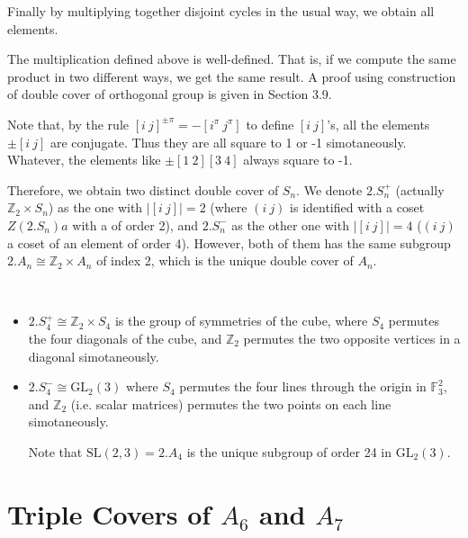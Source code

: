 \documentclass[a4paper,11pt]{article}
\def\subtitle#1{\section{#1}}
\begin{document}
Finally by multiplying together disjoint cycles in the usual way, we obtain all elements.

The multiplication defined above is well-defined. That is, if we compute the same product in two different ways, we get the same result. A proof using construction of double cover of orthogonal group is given in Section 3.9.

Note that, by the rule $[i\ j]^{\pm\pi}=-[i^\pi\ j^\pi]$ to define $[i\ j]$'s, all the elements $\pm [i\ j]$ are conjugate. Thus they are all square to 1 or -1 simotaneously. Whatever, the elements like $\pm[1\ 2][3\ 4]$ always square to -1.  

Therefore, we obtain two distinct double cover of $S_n$. We denote $2.S_n^+$ (actually $\mathbb{Z}_2\times S_n$) as the one with $|[i\ j]|=2$ (where $(i\ j)$ is identified with a coset $Z(2.S_n)a$ with a of order 2), and $2.S_n^-$ as the other one with $|[i\ j]|=4$ ($(i\ j)$ a coset of an element of order 4). However, both of them has the same subgroup $2.A_n\cong \mathbb{Z}_2\times A_n$ of index 2, which is the unique double cover of $A_n$.

\begin{example}\ 

    \begin{itemize}
        \item $2.S_4^+\cong \mathbb{Z}_2\times S_4$ is the group of symmetries of the cube, where $S_4$ permutes the four diagonals of the cube, and $\mathbb{Z}_2$ permutes the two opposite vertices in a diagonal simotaneously.
        \item $2.S_4^-\cong \mathrm{GL}_2(3)$ where $S_4$ permutes the four lines through the origin in $\mathbb{F}_3^2$, and $\mathbb{Z}_2$ (i.e. scalar matrices) permutes the two points on each line simotaneously.
        
        Note that $\mathrm{SL}(2,3)=2.A_4$ is the unique subgroup of order 24 in $\mathrm{GL}_2(3)$. 
    \end{itemize}
\end{example}

\subtitle{Triple Covers of $A_6$ and $A_7$}




\ifx\ChapTwoSecSeven\undefined %
     
\end{document}
